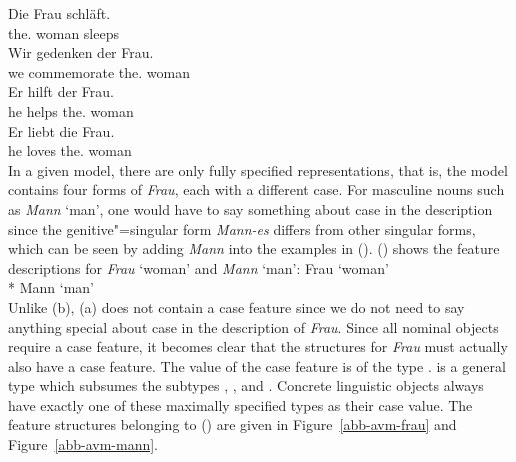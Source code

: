 \eal\settowidth{}
\ex 
\gll Die        Frau schläft. \\      
     the.\nom{} woman sleeps\\
\ex 
\gll Wir gedenken der Frau. \\ 
     we commemorate the.\gen{} woman\\
\ex 
\gll Er hilft der Frau.  \\    
     he helps the.\dat{} woman\\
\ex 
\gll Er liebt die Frau.   \\   
     he loves the.\acc{} woman\\
\zl
In a given model, there are only fully specified representations, that is, the model contains four forms of \emph{Frau}, each with a different case.
For masculine nouns such as \emph{Mann} `man', one would have to say something about case in the description since the genitive"=singular form \emph{Mann-es}
differs from other singular forms, which can be seen by adding \emph{Mann} into the examples in (). () shows the feature descriptions for
\emph{Frau} `woman' and \emph{Mann} `man':
\eal
\ex\label{avm-frau}
Frau `woman'\\*
\ex\label{avm-mann}
Mann `man'\\
\zl
Unlike (b), (a) does not contain a case feature since we do not need to say anything special about case in the description of \emph{Frau}.
Since all nominal objects require a case feature, it becomes clear that the structures for \emph{Frau} must actually also have a case feature.
The value of the case feature is of the type .  is a general type which subsumes the subtypes , ,
 and . Concrete linguistic objects always have exactly one of these maximally specified types as their case value. The feature structures
belonging to () are given in Figure~\ref{abb-avm-frau} and Figure~\ref{abb-avm-mann}.%

